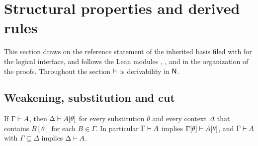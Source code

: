 \section{Structural properties and derived rules}
\label{base:sec:structural}

This section draws on the reference statement of the inherited basis filed
with  for the logical interface, and follows the Lean
modules , ,  and
 in the organization of the proofs.  Throughout the
section $\vdash$ is derivability in $\mathsf{N}$.

\subsection{Weakening, substitution and cut}

\begin{lemma}
\label{base:lem:struct}
If $\Gamma\vdash A$, then $\Delta\vdash A[\theta]$ for every substitution
$\theta$ and every context $\Delta$ that contains $B[\theta]$ for each
$B\in\Gamma$.  In particular $\Gamma\vdash A$ implies
$\Gamma[\theta]\vdash A[\theta]$, and $\Gamma\vdash A$ with
$\Gamma\subseteq\Delta$ implies $\Delta\vdash A$.
\end{lemma}

